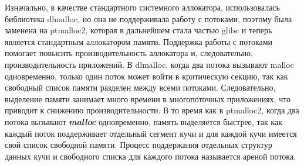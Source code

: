 Изначально, в качестве стандартного системного аллокатора, использовалась библиотека dlmalloc, но она не поддерживала работу с потоками, поэтому была заменена на ptmalloc2, которая в дальнейшем стала частью glibc и теперь является стандартным аллокатором памяти. Поддержка работы с потоками помогает повысить производительность аллокатора и, следовательно, производительность приложений. В dlmalloc, когда два потока вызывают malloc одновременно, только один поток может войти в критическую секцию, так как свободный список памяти разделен между всеми потоками. Следовательно, выделение памяти занимает много времени в многопоточных приложениях, что приводит к снижению производительности. В то время как в ptmalloc2, когда два потока вызывают \textbf{\textit{malloc}} одновременно, память выделяется быстрее, так как каждый поток поддерживает отдельный сегмент кучи и для каждой кучи имеется свой список свободной памяти. Процесс поддержания отдельных структур данных кучи и свободного списка для каждого потока называется ареной потока.\cite{glibc-malloc-overview}

